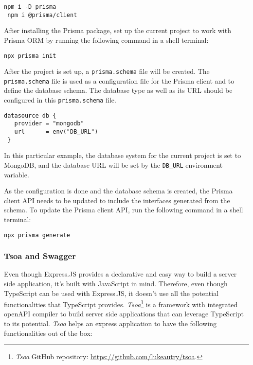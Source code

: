    \begin{lstlisting}[caption={Installing Prisma (Shell)}]
 npm i -D prisma 
 npm i @prisma/client
   \end{lstlisting}

   After installing the Prisma package, set up the current project to work with Prisma ORM by running the following command in a shell terminal:

   \begin{lstlisting}[caption={Set up project with Prisma}]
 npx prisma init
   \end{lstlisting}
   
   After the project is set up, a \verb;prisma.schema; file will be created. The \verb;prisma.schema; file is used as a configuration file for the Prisma client and to define the database schema. The database type as well as its URL should be configured in this \verb;prisma.schema; file. 

   \begin{lstlisting}[caption={Configuring database type and URL (Prisma)}]
 datasource db {
   provider = "mongodb"
   url      = env("DB_URL")
 }  
   \end{lstlisting}

   In this particular example, the database system for the current project is set to MongoDB, and the database URL will be set by the \verb;DB_URL; environment variable.

   As the configuration is done and the database schema is created, the Prisma client API needs to be updated to include the interfaces generated from the schema. To update the Prisma client API, run the following command in a shell terminal:
   
   \begin{lstlisting}[caption={Update Prisma client API to include generated interfaces from the schema (Shell)}]
  npx prisma generate 
   \end{lstlisting}
   
  \subsubsection{Tsoa and Swagger}
  Even though Express.JS provides a declarative and easy way to build a server side application, it's built with JavaScript in mind. Therefore, even though TypeScript can be used with Express.JS, it doesn't use all the potential functionalities that TypeScript provides. \emph{Tsoa}\footnote{\emph{Tsoa} GitHub repository: \url{https://github.com/lukeautry/tsoa}.} is a framework with integrated openAPI compiler to build server side applications that can leverage TypeScript to its potential. \emph{Tsoa} helps an express application to have the following functionalities out of the box:

